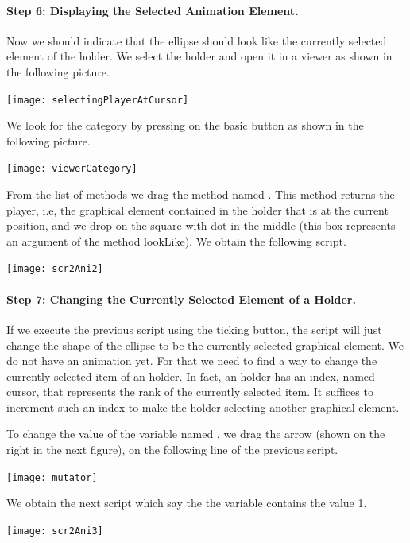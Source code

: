 \paragraph{Step 6: Displaying the Selected Animation Element.} Now we should indicate that the ellipse should look like the
currently selected element of the holder. We select the holder and open it in a viewer as shown in the following picture. 
\begin{center}\texttt{[image: selectingPlayerAtCursor]}\end{center}

We look for the category  by pressing on the basic button as shown in the following picture.
\begin{center}\texttt{[image: viewerCategory]}\end{center}

From the list of methods we drag the method named . This method returns the player, i.e, the graphical element 
contained in the holder that is at the current position, and we drop on the square with dot in the middle (this box represents an argument of the method lookLike). We obtain the following script. 
\begin{center}\texttt{[image: scr2Ani2]}\end{center}

\paragraph{Step 7: Changing the Currently Selected Element of a Holder.}
If we execute the previous script using the ticking button, the script will just change the shape of the 
ellipse to be the currently selected graphical element. We do not have an animation yet. For that we need to find a way to change
the currently selected item of an holder. In fact, an holder has an index, named cursor,  that represents the rank of the currently selected item. It suffices to increment such an index to make the holder selecting another graphical element. 

To change the value of the variable named , we drag the arrow (shown on the right in the next figure), on the following line of the previous script. 
\begin{center}\texttt{[image: mutator]}\end{center}
We obtain the next script which say the the variable contains the value 1. 

\begin{center}\texttt{[image: scr2Ani3]}\end{center}

